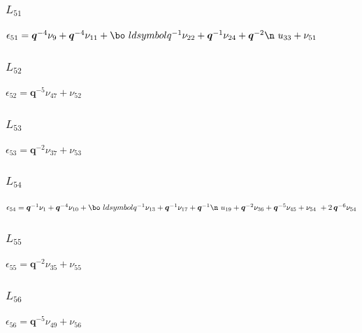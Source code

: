 \subsubsection*{$L_{51}$}
$
\epsilon_{51} = \boldsymbol{q}^{-4}\nu_{9} + \boldsymbol{q}^{-4}\nu_{11} + \bo\
ldsymbol{q}^{-1}\nu_{22} + \boldsymbol{q}^{-1}\nu_{24} + \boldsymbol{q}^{-2}\n\
u_{33} + \nu_{51}
$

\subsubsection*{$L_{52}$}
$
\epsilon_{52} = \boldsymbol{q}^{-5}\nu_{47} + \nu_{52}
$

\subsubsection*{$L_{53}$}
$
\epsilon_{53} = \boldsymbol{q}^{-2}\nu_{37} + \nu_{53}
$

\subsubsection*{$L_{54}$}
$
\epsilon_{54} = \boldsymbol{q}^{-1}\nu_{1} + \boldsymbol{q}^{-4}\nu_{10} + \bo\
ldsymbol{q}^{-1}\nu_{13} + \boldsymbol{q}^{-1}\nu_{17} + \boldsymbol{q}^{-1}\n\
u_{19} + \boldsymbol{q}^{-2}\nu_{36} + \boldsymbol{q}^{-5}\nu_{45} + \nu_{54} \
+ 2\,\boldsymbol{q}^{-6}\nu_{54}
$

\subsubsection*{$L_{55}$}
$
\epsilon_{55} = \boldsymbol{q}^{-2}\nu_{35} + \nu_{55}
$

\subsubsection*{$L_{56}$}
$
\epsilon_{56} = \boldsymbol{q}^{-5}\nu_{49} + \nu_{56}
$

